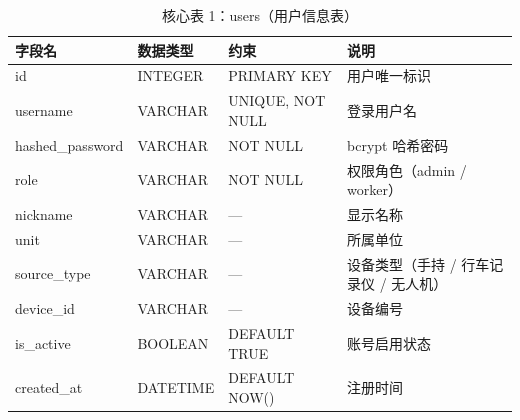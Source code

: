 \documentclass[UTF8, a4paper, fontset=ubuntu]{ctexart}
\begin{document}
\begin{table}[H]
    \centering
    \caption{核心表 1：users（用户信息表）}
    \begin{tabular}{lp{3cm}lp{5cm}}
        \toprule
        字段名 & 数据类型 & 约束 & 说明 \\ \midrule
        id              & INTEGER  & PRIMARY KEY          & 用户唯一标识 \\
        username        & VARCHAR  & UNIQUE, NOT NULL     & 登录用户名 \\
        hashed\_password & VARCHAR & NOT NULL             & bcrypt 哈希密码 \\
        role            & VARCHAR  & NOT NULL             & 权限角色（admin / worker） \\
        nickname        & VARCHAR  & ---                  & 显示名称 \\
        unit            & VARCHAR  & ---                  & 所属单位 \\
        source\_type    & VARCHAR  & ---                  & 设备类型（手持 / 行车记录仪 / 无人机） \\
        device\_id      & VARCHAR  & ---                  & 设备编号 \\
        is\_active      & BOOLEAN  & DEFAULT TRUE         & 账号启用状态 \\
        created\_at     & DATETIME & DEFAULT NOW()        & 注册时间 \\
        \bottomrule
    \end{tabular}
\end{table}
\end{document}

